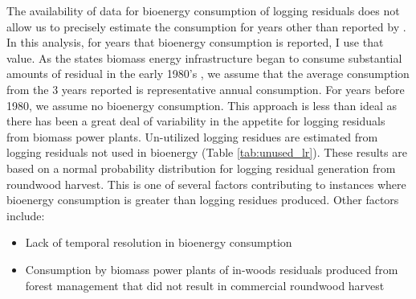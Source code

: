 \documentclass[a4paper]{article}
\begin{document}
The availability of data for bioenergy consumption of logging residuals does not allow us to precisely estimate the consumption for years other than reported by \cite{Mciver2012}. In this analysis, for years that bioenergy consumption is reported, I use that value. As the states biomass energy infrastructure began to consume substantial amounts of residual in the early 1980's \citep{Morris2000}, we assume that the average consumption from the 3 years reported is representative annual consumption. For years before 1980, we assume no bioenergy consumption.  This approach is less than ideal as there has been a great deal of variability in the appetite for logging residuals from biomass power plants. Un-utilized logging residues are estimated from logging residuals not used in bioenergy (Table \ref{tab:unused_lr}). These results are based on a normal probability distribution for logging residual generation from roundwood harvest. This is one of several factors contributing to instances where bioenergy consumption is greater than logging residues  produced. Other factors include:

\begin{itemize}
\item Lack of temporal resolution in bioenergy consumption
\item Consumption by biomass power plants of in-woods residuals produced from forest management that did not result in commercial roundwood harvest
\end{itemize}
\end{document}
